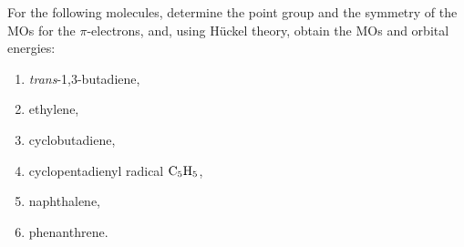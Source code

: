 \documentclass[a4paper]{book}
\begin{document}
	\setcounter{chapter}{10}

	\begin{exercise}
		For the following molecules, determine the point group and the symmetry of the MOs for the $\pi$-electrons, and, using H{\"u}ckel theory, obtain the MOs and orbital energies:
		\begin{enumerate}[label=(\alph*)]
		\item {\it trans}-1,3-butadiene,
		\item ethylene,
		\item cyclobutadiene,
		\item cyclopentadienyl radical $\ce{C5H5}$,
		\item naphthalene,
		\item phenanthrene.
		\end{enumerate}
	\end{exercise}
\end{document}
